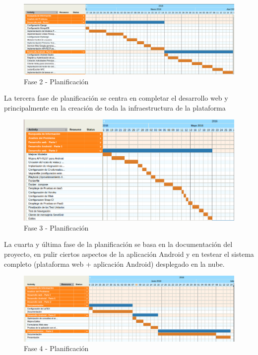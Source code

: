 \documentclass[a4paper,11pt]{book}
\begin{document}
\begin{figure}[H] 
\centering 
\includegraphics[scale=0.45]{imagenes/planificacion/planificacion2.png}
\caption{ Fase 2 - Planificación\cite{propio}  }  
\end{figure}

La tercera fase de planificación se centra en completar el desarrollo web y principalmente en la creación de toda la infraestructura de la plataforma

\begin{figure}[H] 
\centering 
\includegraphics[scale=0.45]{imagenes/planificacion/planificacion3.png}
\caption{ Fase 3 - Planificación\cite{propio}  }  
\end{figure}

La cuarta y última fase de la planificación se basa en la documentación del proyecto, en pulir ciertos aspectos de la aplicación Android y en testear el sistema completo (plataforma web + aplicación Android) desplegado en la nube. 

\begin{figure}[H] 
\centering 
\includegraphics[scale=0.45]{imagenes/planificacion/planificacion4.png}
\caption{ Fase 4 - Planificación\cite{propio}  }  
\end{figure}
\end{document}
